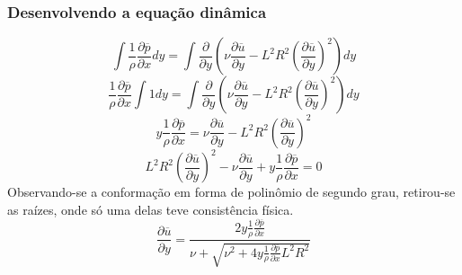 \documentclass[xcolor=dvipsnames,10pt,aspectratio=169]{beamer}
\begin{document}
		\begin{frame}
			\frametitle{Desenvolvendo a equação dinâmica}
			
			\begin{equation}
			\int \frac{1}{\rho} \frac{\partial \overline{p}}{\partial x} dy = \int \frac{\partial}{\partial y} \left( \nu  \frac{\partial \overline{u}}{\partial y} - {L}^2 R ^2 \left(\frac{\partial \overline{u}}{\partial y}\right) ^ 2 \right) dy  
			\end{equation}
			\begin{equation}
			\frac{1}{\rho} \frac{\partial \overline{p}}{\partial x} \int 1 dy = \int \frac{\partial}{\partial y} \left( \nu  \frac{\partial \overline{u}}{\partial y} - {L}^2 R ^2 \left(\frac{\partial \overline{u}}{\partial y}\right) ^ 2 \right) dy  
			\end{equation}
			\begin{equation}
			y \frac{1}{\rho} \frac{\partial \overline{p}}{\partial x} =  \nu  \frac{\partial \overline{u}}{\partial y} - {L}^2 R ^2 \left(\frac{\partial \overline{u}}{\partial y}\right) ^ 2 
			\end{equation}
			\begin{equation}
			{L}^2 R ^2 \left(\frac{\partial \overline{u}}{\partial y}\right) ^ 2 - \nu  \frac{\partial \overline{u}}{\partial y} + y \frac{1}{\rho} \frac{\partial \overline{p}}{\partial x} = 0
			\end{equation}
			Observando-se a conformação em forma de polinômio de segundo grau, retirou-se as raízes, onde só uma delas teve consistência física.
			\begin{equation}
			\frac{\partial \overline{u}}{\partial y} = \frac{2 y \frac{1}{\rho}\frac{\partial \overline{p}}{\partial x} }{ \nu + \sqrt{\nu ^2 + 4 y \frac{1}{\rho} \frac{\partial \overline{p}}{\partial x} L ^2 R ^2}}
			\end{equation}
		\end{frame}
			
		
		
		
	
\end{document}
